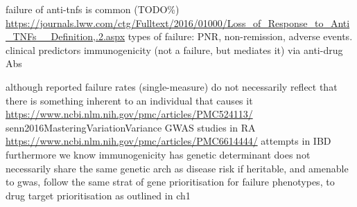 \begin{outline}
\1 failure of anti-tnfs is common (TODO\%) \url{https://journals.lww.com/ctg/Fulltext/2016/01000/Loss_of_Response_to_Anti_TNFs__Definition,.2.aspx}
    \2 types of failure: \gls{PNR}, non-remission, adverse events.
        \3 clinical predictors \autocite{kennedy2019PredictorsAntiTNFTreatment}
        \3 immunogenicity (not a failure, but mediates it) via anti-drug Abs

\1 although reported failure rates (single-measure) do not necessarily reflect that there is something inherent to an individual that causes it \url{https://www.ncbi.nlm.nih.gov/pmc/articles/PMC524113/} senn2016MasteringVariationVariance
    \2 GWAS studies in RA \url{https://www.ncbi.nlm.nih.gov/pmc/articles/PMC6614444/}
    \2 attempts in IBD \autocite{gaujoux2019CellcentredMetaanalysisReveals}
    \2 furthermore we know immunogenicity has genetic determinant \autocite{sazonovs2019HLADQA105Carriage}
    \2 does not necessarily share the same genetic arch as disease risk
    \2 if heritable, and amenable to gwas, follow the same strat of gene prioritisation for failure phenotypes, to drug target prioritisation as outlined in ch1


\end{outline}
